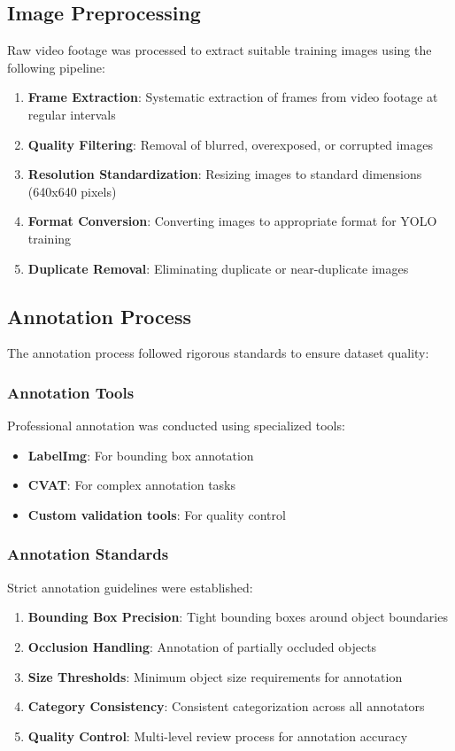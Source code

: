 \subsection{Image Preprocessing}

Raw video footage was processed to extract suitable training images using the following pipeline:

\begin{enumerate}
    \item \textbf{Frame Extraction}: Systematic extraction of frames from video footage at regular intervals
    \item \textbf{Quality Filtering}: Removal of blurred, overexposed, or corrupted images
    \item \textbf{Resolution Standardization}: Resizing images to standard dimensions (640x640 pixels)
    \item \textbf{Format Conversion}: Converting images to appropriate format for YOLO training
    \item \textbf{Duplicate Removal}: Eliminating duplicate or near-duplicate images
\end{enumerate}

\subsection{Annotation Process}

The annotation process followed rigorous standards to ensure dataset quality:

\subsubsection{Annotation Tools}

Professional annotation was conducted using specialized tools:
\begin{itemize}
    \item \textbf{LabelImg}: For bounding box annotation
    \item \textbf{CVAT}: For complex annotation tasks
    \item \textbf{Custom validation tools}: For quality control
\end{itemize}

\subsubsection{Annotation Standards}

Strict annotation guidelines were established:
\begin{enumerate}
    \item \textbf{Bounding Box Precision}: Tight bounding boxes around object boundaries
    \item \textbf{Occlusion Handling}: Annotation of partially occluded objects
    \item \textbf{Size Thresholds}: Minimum object size requirements for annotation
    \item \textbf{Category Consistency}: Consistent categorization across all annotators
    \item \textbf{Quality Control}: Multi-level review process for annotation accuracy
\end{enumerate}

